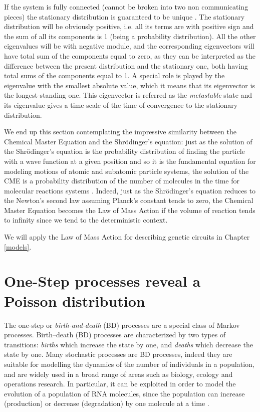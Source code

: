 \documentclass[12pt,a4paper]{report}
\begin{document}
If the system is fully connected (cannot be broken into two non communicating pieces) the stationary distribution is guaranteed to be unique \cite{PHD}. The stationary distribution will be obviously positive, i.e. all its terms are with positive sign and the sum of all its components is 1 (being a probability distribution). All the other eigenvalues will be with negative module, and the corresponding eigenvectors will have total sum of the components equal to zero, as they can be interpreted as the difference between the present distribution and the stationary one, both having total sums of the components equal to 1. A special role is played by the eigenvalue with the smallest absolute value, which it means that its eigenvector is the longest-standing one. This eigenvector is referred as the \emph{metastable} state and its eigenvalue gives a time-scale of the time of convergence to the stationary distribution.

We end up this section contemplating the impressive similarity between the Chemical Master Equation and the Shr\"{o}dinger's equation: just as the solution of the Shr\"{o}dinger's equation is the probability distribution of finding the particle with a wave function at a given position and so it is the fundamental equation for modeling motions of atomic and subatomic particle systems, the solution of the CME is a probability distribution of the number of molecules in the time for molecular reactions systems \cite{Brizi}. Indeed, just as the Shr\"{o}dinger's equation reduces to the Newton's second law assuming Planck's constant tends to zero, the Chemical Master Equation becomes the Law of Mass Action if the volume of reaction tends to infinity since we tend to the deterministic context. 

We will apply the Law of Mass Action for describing genetic circuits in Chapter \ref{models}.
     


\section{One-Step processes reveal a Poisson distribution}\label{theonestepdiscussion}
The one-step or \emph{birth-and-death} (BD) processes are a special class of Markov processes.
Birth–death (BD) processes are characterized by two types of transitions: \emph{births} which increase the state by one, and \emph{deaths} which decrease the state by one. Many stochastic processes are BD processes, indeed they are suitable for modelling the dynamics of the number of individuals in a population, and are widely used in a broad range of areas such as biology, ecology and operations research. In particular, it can be exploited in order to model the evolution of a population of RNA molecules, since the population can increase (production) or decrease (degradation) by one molecule at a time \cite{onesteparticle}. 
\end{document}
